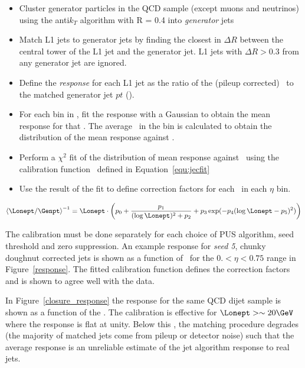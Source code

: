 \begin{itemize}
\item Cluster generator particles in the QCD sample (except muons and neutrinos) using the anti$k_T$ algorithm with R = 0.4 into \emph{generator} jets
\item Match L1 jets to generator jets by finding the closest in $\Delta R$ between the central tower of the L1 jet and the generator jet. L1 jets with 
$\Delta R > 0.3$ from any generator jet are ignored.
\item Define the \emph{response} for each L1 jet as the ratio of the (pileup corrected) \Lonept~to the matched generator jet $pt$ (\Genpt).
\item For each bin in \Genpt, fit the response with a Gaussian to obtain the mean response for that \Genpt. 
The average \Lonept~in the bin is calculated to obtain the distribution of the mean response against \Lonept.
\item Perform a $\chi^2$ fit of the distribution of mean response against \Lonept~using the calibration function~\cite{l1jet_calibration} defined in Equation~\ref{equ:jecfit}
\item Use the result of the fit to define correction factors for each \Lonept~in each $\eta$ bin.
\end{itemize}

\begin{equation}
\left<\Lonept/\Genpt\right>^{-1} = \Lonept \cdot \left ( p_{0} + 
\frac{p_{1}}{(\log \Lonept)^{2}+p_{2}}+p_{3} \exp(-p_{4}
(\log \Lonept-p_{5} ) ^{2}) \right )
\label{equ:jecfit}
\end{equation}

The calibration must be done separately for each choice of PUS algorithm, seed threshold and zero suppression. 
An example response for \emph{seed 5}, chunky doughnut corrected jets is shown as a function of \Lonept~for 
the $0. < \eta < 0.75$ range in Figure~\ref{response}. The fitted calibration function defines the correction 
factors and is shown to agree well with the data.

In Figure~\ref{closure_response} the response for the same QCD dijet sample is shown as a function of the \Lonept. The calibration
is effective for $\Lonept > \sim 20\GeV$ where the response is flat at unity. Below this \pt,
the matching procedure degrades (the majority of matched jets come from pileup or detector noise) 
such that the average response is an unreliable estimate of the jet algorithm response to real jets.


